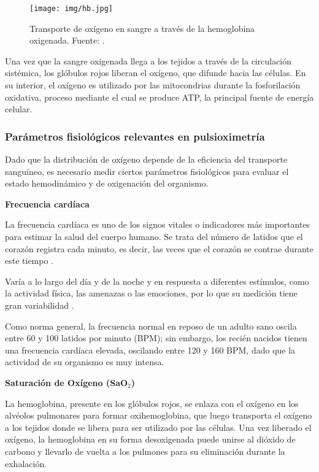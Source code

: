 \begin{figure}[H]
    \centering
    \texttt{[image: img/hb.jpg]}
    \caption{Transporte de oxígeno en sangre a través de la hemoglobina oxigenada. Fuente: \cite{cigna_hemoglobina}.}
    \label{fig:hb}
\end{figure}

Una vez que la sangre oxigenada llega a los tejidos a través de la circulación sistémica, los glóbulos rojos liberan el oxígeno, que difunde hacia las células. En su interior, el oxígeno es utilizado por las mitocondrias durante la fosforilación oxidativa, proceso mediante el cual se produce ATP, la principal fuente de energía celular. \\


\subsubsection{Parámetros fisiológicos relevantes en pulsioximetría}
Dado que la distribución de oxígeno depende de la eficiencia del transporte sanguíneo, es necesario medir ciertos parámetros fisiológicos para evaluar el estado hemodinámico y de oxigenación del organismo.

\newpage

\textbf{Frecuencia cardíaca}

La frecuencia cardíaca es uno de los signos vitales o indicadores más importantes para estimar la salud del cuerpo humano. Se trata del número de latidos que el corazón registra cada minuto, es decir, las veces que el corazón se contrae durante este tiempo \cite{enfermeriaCardiologia2025}.   

Varía a lo largo del día y de la noche y en respuesta a diferentes estímulos, como la actividad física, las amenazas o las emociones, por lo que su medición tiene gran variabilidad \cite{fundacionCorazon2025}.

Como norma general, la frecuencia normal en reposo de un adulto sano oscila entre 60 y 100 latidos por minuto (BPM); sin embargo, los recién nacidos tienen una frecuencia cardíaca elevada, oscilando entre 120 y 160 BPM, dado que la actividad de su organismo es muy intensa. 


\textbf{Saturación de Oxígeno (SaO$_2$)}

La hemoglobina, presente en los glóbulos rojos, se enlaza con el oxígeno en los alvéolos pulmonares para formar oxihemoglobina, que luego transporta el oxígeno a los tejidos donde se libera para ser utilizado por las células. Una vez liberado el oxígeno, la hemoglobina en su forma desoxigenada puede unirse al dióxido de carbono y llevarlo de vuelta a los pulmones para su eliminación durante la exhalación.  

